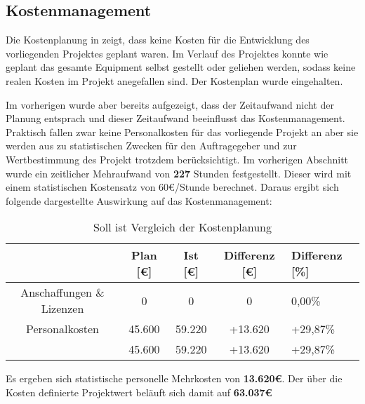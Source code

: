 \subsection{Kostenmanagement}
\label{sec:Kostenmanagement}


Die Kostenplanung in  zeigt, dass keine Kosten für die Entwicklung des vorliegenden Projektes
geplant waren. Im Verlauf des Projektes konnte wie geplant das gesamte Equipment selbst gestellt oder geliehen werden,
sodass keine realen Kosten im Projekt anegefallen sind. Der Kostenplan wurde eingehalten.

Im vorherigen  wurde aber bereits aufgezeigt, dass der Zeitaufwand nicht der Planung entsprach und
dieser Zeitaufwand beeinflusst das Kostenmanagement. Praktisch fallen zwar keine Personalkosten für das vorliegende Projekt
an aber sie werden aus zu statistischen Zwecken für den Auftragegeber und zur Wertbestimmung des Projekt trotzdem
berücksichtigt. Im vorherigen Abschnitt wurde ein zeitlicher Mehraufwand von \textbf{227} Stunden festgestellt. Dieser
wird mit einem statistischen Kostensatz von 60€/Stunde berechnet. Daraus ergibt sich folgende dargestellte
Auswirkung auf das Kostenmanagement:

\begin{table}[h]
\centering
\begin{tabular}{ccccl}
\hline
\multicolumn{1}{l}{}              & Plan {[}€{]} & Ist {[}€{]} & Differenz {[}€{]} & Differenz {[}\%{]} \\ \hline
Anschaffungen \& Lizenzen          & 0           & 0          & 0               & 0,00\%          \\ \hline
Personalkosten                    & 45.600      &  59.220    & +13.620          & +29,87\%         \\ \hline
                                  & 45.600      & 59.220     & +13.620          & +29,87\%          \\ \hline
\end{tabular}
\caption{Soll ist Vergleich der Kostenplanung}%
\label{tab:SollIstVergleichKosten}%
\end{table}

Es ergeben sich statistische personelle Mehrkosten von \textbf{13.620€}. Der über die Kosten definierte Projektwert
beläuft sich damit auf \textbf{63.037€}


